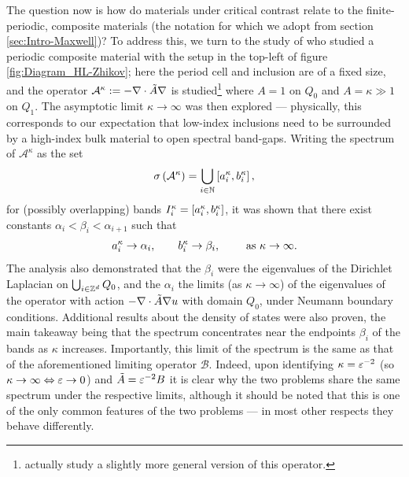 The question now is how do materials under critical contrast relate to the finite-periodic, composite materials (the notation for which we adopt from section \ref{sec:Intro-Maxwell})?
To address this, we turn to the study of \cite{hempel2000spectral} who studied a periodic composite material with the setup in the top-left of figure \ref{fig:Diagram_HL-Zhikov}; here the period cell and inclusion are of a fixed size, and the operator $\mathcal{A}^\kappa:=-\nabla\cdot\tilde{A}\nabla$ is studied\footnote{ actually study a slightly more general version of this operator.} where $A=1$ on $Q_0$ and $A=\kappa\gg 1$ on $Q_1$.
The asymptotic limit $\kappa\rightarrow\infty$ was then explored --- physically, this corresponds to our expectation that low-index inclusions need to be surrounded by a high-index bulk material to open spectral band-gaps.
Writing the spectrum of $\mathcal{A}^\kappa$ as the set
\begin{align*}
	\sigma\left( \mathcal{A}^\kappa \right) = \bigcup_{i\in\mathbb{N}}\left[ a_i^\kappa,b_i^\kappa \right],
\end{align*}
for (possibly overlapping) bands $I_i^\kappa = \left[ a_i^\kappa,b_i^\kappa \right]$, it was shown that there exist constants $\alpha_i < \beta_i < \alpha_{i+1}$ such that
\begin{align*}
	a_i^\kappa \rightarrow \alpha_i, \qquad b_i^\kappa \rightarrow \beta_i, \qquad \ \text{as} \ \kappa \rightarrow\infty.
\end{align*}
The analysis also demonstrated that the $\beta_i$ were the eigenvalues of the Dirichlet Laplacian on $\bigcup_{i\in\mathbb{Z}^d}Q_0$, and the $\alpha_i$ the limits (as $\kappa\rightarrow\infty$) of the eigenvalues of the operator with action $-\nabla\cdot \tilde{A}\nabla u$ with domain $Q_0$, under Neumann boundary conditions.
Additional results about the density of states were also proven, the main takeaway being that the spectrum concentrates near the endpoints $\beta_i$ of the bands as $\kappa$ increases. 
Importantly, this limit of the spectrum is the same as that of the aforementioned limiting operator $\mathcal{B}$.
Indeed, upon identifying $\kappa=\varepsilon^{-2}$ (so $\kappa\rightarrow\infty \Leftrightarrow \varepsilon\rightarrow0$) and $\tilde{A}=\varepsilon^{-2}B$ it is clear why the two problems share the same spectrum under the respective limits, although it should be noted that this is one of the only common features of the two problems --- in most other respects they behave differently.

